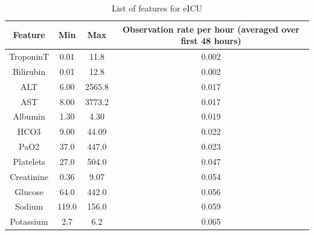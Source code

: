 \begin{table}[ht]
    \centering
    \begin{tabular}{|c|c|c|c|} \hline 
         Feature&  Min&  Max& Observation rate per hour  (averaged over first 48 hours)\\ \hline 
         TroponinT&  0.01&  11.8& 0.002\\ \hline 
         Bilirubin&  0.01&  12.8& 0.002\\ \hline 
         ALT&  6.00&  2565.8& 0.017\\ \hline 
         AST&  8.00&  3773.2& 0.017\\ \hline 
         Albumin&  1.30&  4.30& 0.019\\ \hline 
         HCO3&  9.00&  44.09& 0.022\\ \hline 
         PaO2&  37.0&  447.0& 0.023\\ \hline 
         Platelets&  27.0&  504.0& 0.047\\ \hline 
         Creatinine&  0.36&  9.07& 0.054\\ \hline 
 Glucose& 64.0& 442.0&0.056\\ \hline 
 Sodium& 119.0& 156.0&0.059\\ \hline 
 Potassium& 2.7& 6.2&0.065\\\hline
    \end{tabular}
    \caption{List of features for eICU}
    \label{tab:eicu_features}
\end{table}